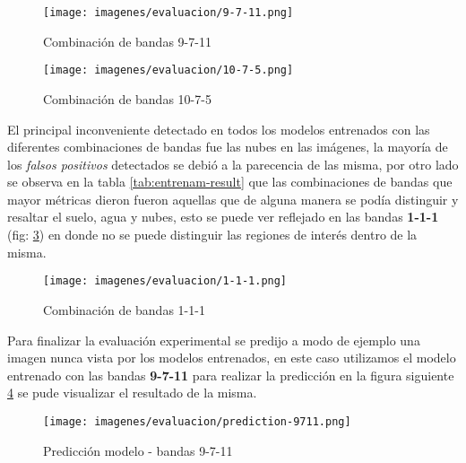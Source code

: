  \begin{figure}[H]
 \centering
  \texttt{[image: imagenes/evaluacion/9-7-11.png]}
  \caption{Combinación de bandas 9-7-11} \label{Fig:imagen_banda_9711}
\end{figure}

  \begin{figure}[H]
 \centering
  \texttt{[image: imagenes/evaluacion/10-7-5.png]}
  \caption{Combinación de bandas 10-7-5} \label{Fig:IOU1075}
\end{figure}
 
El principal inconveniente detectado en todos los modelos entrenados con las diferentes combinaciones de bandas fue las nubes en las imágenes, la mayoría de los \textit{falsos positivos} detectados se debió a la parecencia de las misma, por otro lado se observa en la tabla \ref{tab:entrenam-result} que las combinaciones de bandas que mayor métricas dieron fueron aquellas que de alguna manera se podía distinguir y resaltar el suelo, agua y nubes, esto se puede ver reflejado en las bandas  \textbf{1-1-1} (fig: \ref{Fig:imagen_banda_111}) en donde no se puede distinguir las regiones de interés dentro de la misma. 
 
 \begin{figure}[H]\centering
  \texttt{[image: imagenes/evaluacion/1-1-1.png]}
  \caption{Combinación de bandas 1-1-1} \label{Fig:imagen_banda_111}
\end{figure}
 
Para finalizar la evaluación experimental se predijo a modo de ejemplo una imagen nunca vista por los modelos entrenados, en este caso utilizamos el modelo entrenado con las bandas \textbf{9-7-11} para realizar la predicción en la figura siguiente  \ref{Fig: TP} se pude visualizar el resultado de la misma.

\begin{figure}[H]\centering
  \texttt{[image: imagenes/evaluacion/prediction-9711.png]}
  \caption{Predicción modelo - bandas 9-7-11} \label{Fig: TP}
\end{figure}














